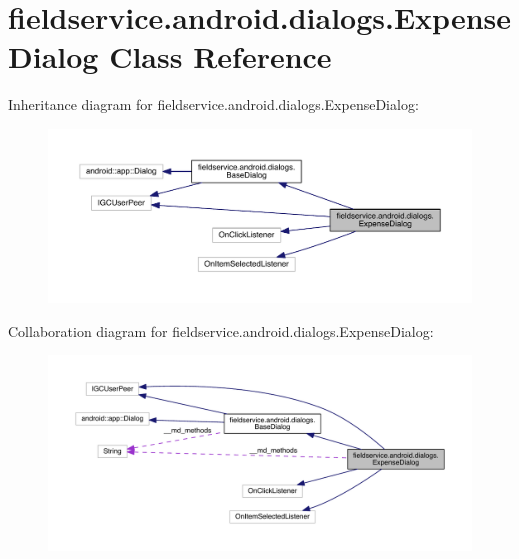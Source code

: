\hypertarget{classfieldservice_1_1android_1_1dialogs_1_1_expense_dialog}{\section{fieldservice.\+android.\+dialogs.\+Expense\+Dialog Class Reference}
\label{classfieldservice_1_1android_1_1dialogs_1_1_expense_dialog}
}


Inheritance diagram for fieldservice.\+android.\+dialogs.\+Expense\+Dialog\+:
\nopagebreak
\begin{figure}[H]
\begin{center}
\leavevmode
\includegraphics[width=350pt]{classfieldservice_1_1android_1_1dialogs_1_1_expense_dialog__inherit__graph}
\end{center}
\end{figure}


Collaboration diagram for fieldservice.\+android.\+dialogs.\+Expense\+Dialog\+:
\nopagebreak
\begin{figure}[H]
\begin{center}
\leavevmode
\includegraphics[width=350pt]{classfieldservice_1_1android_1_1dialogs_1_1_expense_dialog__coll__graph}
\end{center}
\end{figure}
